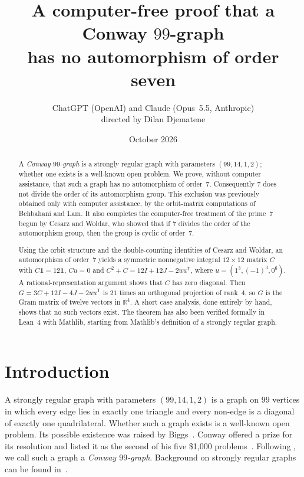 \documentclass[11pt,a4paper]{amsart}
\title[No automorphism of order seven in a Conway 99-graph]{A computer-free proof that a Conway $99$-graph\\ has no automorphism of order seven}
\author[ChatGPT and Claude, directed by D.~Djematene]{ChatGPT (OpenAI) and Claude (Opus~5.5, Anthropic)\\[2pt]
directed by Dilan Djematene}
\date{October 2026}
\theoremstyle{definition}
\theoremstyle{remark}
\newcommand{\R}{\mathbb{R}}
\newcommand{\one}{\mathbf{1}}
\newcommand{\T}{\mathsf{T}}
\begin{document}
\begin{abstract}
A \emph{Conway $99$-graph} is a strongly regular graph with parameters $(99,14,1,2)$; whether one exists
is a well-known open problem. We prove, without computer assistance, that such a graph has no automorphism
of order~$7$. Consequently $7$ does not divide the order of its automorphism group. This exclusion was
previously obtained only with computer assistance, by the orbit-matrix computations of Behbahani and Lam. It also completes
the computer-free treatment of the prime~$7$ begun by Cesarz and Woldar, who showed that if $7$ divides
the order of the automorphism group, then the group is cyclic of order~$7$.

Using the orbit structure and the double-counting identities of Cesarz and Woldar, an automorphism of
order~$7$ yields a symmetric nonnegative integral $12\times12$ matrix $C$ with $C\one=12\one$, $Cu=0$ and
$C^2+C=12I+12J-2uu^{\T}$, where $u=(1^3,(-1)^3,0^6)$. A rational-representation argument shows that $C$
has zero diagonal. Then $G=3C+12I-4J-2uu^{\T}$ is $21$ times an orthogonal projection of rank~$4$, so $G$
is the Gram matrix of twelve vectors in $\R^4$. A short case analysis, done entirely by hand, shows that no
such vectors exist. The theorem has also been verified formally in Lean~4 with Mathlib, starting from
Mathlib's definition of a strongly regular graph.
\end{abstract}

\maketitle

\section{Introduction}\label{sec:intro}

A strongly regular graph with parameters $(99,14,1,2)$ is a graph on $99$ vertices in which every edge lies
in exactly one triangle and every non-edge is a diagonal of exactly one quadrilateral. Whether such a graph
exists is a well-known open problem. Its possible existence was raised by Biggs~\cite{Bi71}. Conway offered
a prize for its resolution and listed it as the second of his five \$1{,}000 problems~\cite{Co}. Following
\cite{CW25}, we call such a graph a \emph{Conway $99$-graph}. Background on strongly regular graphs can
be found in~\cite{BvM22}.
\end{document}
